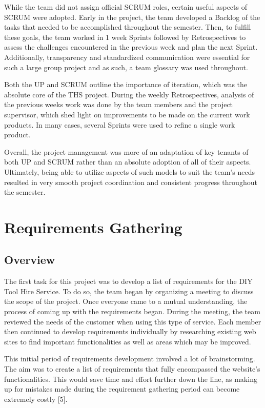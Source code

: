 While the team did not assign official SCRUM roles, certain useful
aspects of SCRUM were adopted. Early in the project, the team developed
a Backlog of the tasks that needed to be accomplished throughout the
semester. Then, to fulfill these goals, the team worked in 1 week
Sprints followed by Retrospectives to assess the challenges encountered
in the previous week and plan the next Sprint. Additionally,
transparency and standardized communication were essential for such a
large group project and as such, a team glossary was used throughout.

Both the UP and SCRUM outline the importance of iteration, which was the
absolute core of the THS project. During the weekly Retrospectives,
analysis of the previous weeks work was done by the team members and the
project supervisor, which shed light on improvements to be made on the
current work products. In many cases, several Sprints were used to
refine a single work product.

Overall, the project management was more of an adaptation of key tenants
of both UP and SCRUM rather than an absolute adoption of all of their
aspects. Ultimately, being able to utilize aspects of such models to
suit the team's needs resulted in very smooth project coordination and
consistent progress throughout the semester.

\newpage

\hypertarget{requirements-gathering}{%
\section{Requirements Gathering}\label{requirements-gathering}}

\hypertarget{overview}{%
\subsection{Overview}\label{overview}}

The first task for this project was to develop a list of requirements
for the DIY Tool Hire Service. To do so, the team began by organizing a
meeting to discuss the scope of the project. Once everyone came to a
mutual understanding, the process of coming up with the requirements
began. During the meeting, the team reviewed the needs of the customer
when using this type of service. Each member then continued to develop
requirements individually by researching existing web sites to find
important functionalities as well as areas which may be improved.

This initial period of requirements development involved a lot of
brainstorming. The aim was to create a list of requirements that fully
encompassed the website's functionalities. This would save time and
effort further down the line, as making up for mistakes made during the
requirement gathering period can become extremely costly {[}5{]}.


